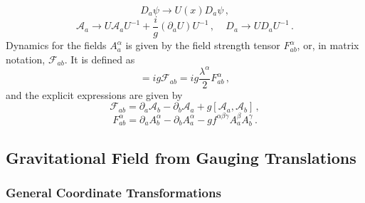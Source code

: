 \documentclass[12pt]{article}
\begin{document}
\begin{equation}
D_a\psi\rightarrow U(x)D_a\psi  \,,
\end{equation}
\begin{equation}\label{GaugeFieldTransfNonabelianCase}
\mathcal{A}_a\rightarrow U\mathcal{A}_a U^{-1}+\dfrac{i}{g}(\partial_a U)U^{-1} \,, ~~~~~ D_a\rightarrow UD_a U^{-1} \,.
\end{equation}
Dynamics for the fields $A^\alpha_a$ is given by the field strength tensor $F^\alpha_{ab}$, or, in matrix notation, $\mathcal{F}_{ab}$. It is defined as
\begin{equation}
[D_a,D_b]=ig\mathcal{F}_{ab}=ig\dfrac{\lambda^\alpha}{2}F^\alpha_{ab} \,,
\end{equation}
and the explicit expressions are given by
\begin{equation}
\mathcal{F}_{ab}=\partial_a\mathcal{A}_b-\partial_b\mathcal{A}_a+g[\mathcal{A}_a,\mathcal{A}_b] \,,
\end{equation}
\begin{equation}
F^\alpha_{ab}=\partial_a A^\alpha_b-\partial_b A^\alpha_a -g f^{\alpha\beta\gamma}A^\beta_a A^\gamma_b \,.
\end{equation}

\subsection{Gravitational Field from Gauging Translations}
\label{sec:gravfield}

\subsubsection{General Coordinate Transformations}
\end{document}
